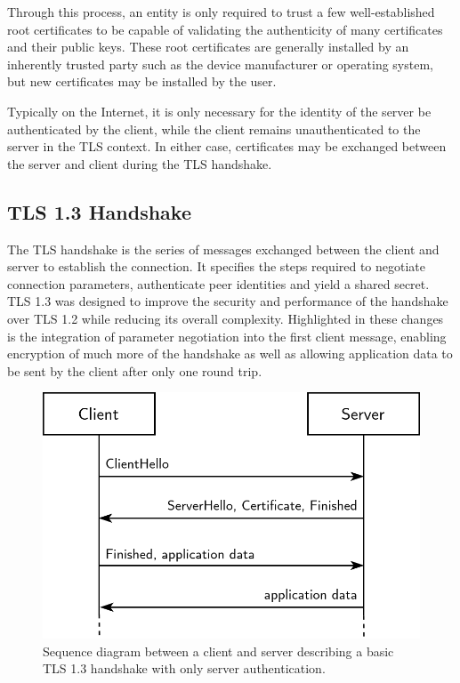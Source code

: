 Through this process, an entity is only required to trust a few well-established root certificates to be capable of validating the authenticity of many certificates and their public keys. These root certificates are generally installed by an inherently trusted party such as the device manufacturer or operating system, but new certificates may be installed by the user.

Typically on the Internet, it is only necessary for the identity of the server be authenticated by the client, while the client remains unauthenticated to the server in the TLS context. In either case, certificates may be exchanged between the server and client during the TLS handshake.

\subsection{TLS 1.3 Handshake}

The TLS handshake is the series of messages exchanged between the client and server to establish the connection. It specifies the steps required to negotiate connection parameters, authenticate peer identities and yield a shared secret. TLS 1.3 was designed to improve the security and performance of the handshake over TLS 1.2 while reducing its overall complexity. Highlighted in these changes is the integration of parameter negotiation into the first client message, enabling encryption of much more of the handshake as well as allowing application data to be sent by the client after only one round trip.

\begin{figure}[ht]
\centerline{\includegraphics[width=120mm]{images/tls-handshake.png}}
\caption[Basic TLS 1.3 handshake]{Sequence diagram between a client and server describing a basic TLS 1.3 handshake with only server authentication.}
\label{tls_handshake_figure}
\end{figure}

